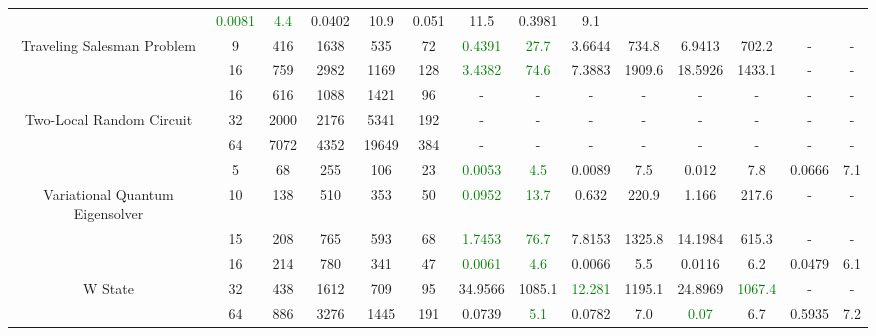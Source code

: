 \begin{table}[htb]
{\begin{tabular}{|c|c|c|c|c|c|c|c|c|c|c|c|c|c|}
 & \textcolor{green}{0.0081} & \textcolor{green}{4.4}
 & 0.0402 & 10.9
 & 0.051 & 11.5
 & 0.3981 & 9.1
 \\
Traveling Salesman Problem & 
9 & 416 & 1638 & 535 & 72
 & \textcolor{green}{0.4391} & \textcolor{green}{27.7}
 & 3.6644 & 734.8
 & 6.9413 & 702.2
 & - & -
 \\
 & 
16 & 759 & 2982 & 1169 & 128
 & \textcolor{green}{3.4382} & \textcolor{green}{74.6}
 & 7.3883 & 1909.6
 & 18.5926 & 1433.1
 & - & -
 \\
\hline
 & 
16 & 616 & 1088 & 1421 & 96
 & - & -
 & - & -
 & - & -
 & - & -
 \\
Two-Local Random Circuit & 
32 & 2000 & 2176 & 5341 & 192
 & - & -
 & - & -
 & - & -
 & - & -
 \\
 & 
64 & 7072 & 4352 & 19649 & 384
 & - & -
 & - & -
 & - & -
 & - & -
 \\
\hline
 & 
5 & 68 & 255 & 106 & 23
 & \textcolor{green}{0.0053} & \textcolor{green}{4.5}
 & 0.0089 & 7.5
 & 0.012 & 7.8
 & 0.0666 & 7.1
 \\
Variational Quantum Eigensolver & 
10 & 138 & 510 & 353 & 50
 & \textcolor{green}{0.0952} & \textcolor{green}{13.7}
 & 0.632 & 220.9
 & 1.166 & 217.6
 & - & -
 \\
 & 
15 & 208 & 765 & 593 & 68
 & \textcolor{green}{1.7453} & \textcolor{green}{76.7}
 & 7.8153 & 1325.8
 & 14.1984 & 615.3
 & - & -
 \\
\hline
 & 
16 & 214 & 780 & 341 & 47
 & \textcolor{green}{0.0061} & \textcolor{green}{4.6}
 & 0.0066 & 5.5
 & 0.0116 & 6.2
 & 0.0479 & 6.1
 \\
W State & 
32 & 438 & 1612 & 709 & 95
 & 34.9566 & 1085.1
 & \textcolor{green}{12.281} & 1195.1
 & 24.8969 & \textcolor{green}{1067.4}
 & - & -
 \\
 & 
64 & 886 & 3276 & 1445 & 191
 & 0.0739 & \textcolor{green}{5.1}
 & 0.0782 & 7.0
 & \textcolor{green}{0.07} & 6.7
 & 0.5935 & 7.2
 \\
\hline
\end{tabular}}
\end{table}